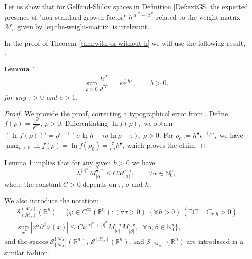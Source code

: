 \documentclass{article}
\theoremstyle{thmstyleone}
\newtheorem{Lemma}[Theorem]{Lemma}%
\theoremstyle{thmstyletwo}%
\theoremstyle{thmstylethree}%
\begin{document}
Let us show that for Gelfand-Shilov spaces in Definition
\ref{Def:extGS} the expected presence of "non-standard growth factor"
$h^{|\alpha|^\sigma + |\beta|^\sigma}$  
related to
the weight matrix  $\mathcal{M}_\sigma$ given by
\eqref{eq:the-weight-matrix} is irrelevant.

In the proof of Theorem \ref{thm:with-or-without-h} 
we will use the following result, \cite[Lemma 2.3]{PTT-01}. 

\begin{Lemma} \label{lm1}
\begin{equation} \label{eq:lema-from-ptt}
 \sup_{\rho >0}  \frac{h^{\rho^\sigma}}{\rho^{\tau \rho ^\sigma}} 
 = e^{\frac{\tau}{\sigma e} h^{\frac{\sigma}{\tau}}}, \qquad h>0,
  \end{equation}
for any $\tau > 0$ and $\sigma >1$.
  \end{Lemma}

\begin{proof} We provide the proof, correcting a typographical error from \cite{PTT-01}.
Define $f(\rho)=\frac{h^{\rho^{\sigma}}}{\rho^{\tau \rho^{\sigma}}}$, $\rho>0$. Differentiating $\ln f(\rho),$ we obtain
$(\ln f(\rho))'= \rho^{\sigma-1}(\sigma\ln h-\tau\sigma \ln \rho -\tau)$, $\rho>0.$
For $\rho_0:=h^{\frac{1}{\tau}}e^{-1/\sigma},$ we have
$\max_{\rho>0}\ln f(\rho)= \ln f(\rho_0)= \frac{\tau}{e\sigma} h^{\frac{\sigma}{\tau}}$,
which proves the claim.
\end{proof}
  
  Lemma \ref{lm1} implies
that for any given $h > 0$ we have
\begin{equation}\label{jede h}
    h ^{|\alpha|^\sigma}  M^{\frac{\tau}{2}, \sigma} _{|\alpha|} \leq
 C   M^{\tau, \sigma} _{|\alpha|}, \qquad \forall \alpha \in \mathbb{N}_0 ^n,
 \end{equation}
where the constant $C>0$ depends on $\tau$, $\sigma$ and $h$.


We also introduce the notation:
\begin{multline} \label{eq:GS-with-factor}
   \mathscr S_{(\mathcal{M}_\sigma ) }^{ (\mathcal{M}_\sigma )} (\mathbb R^n)  =
    \Big\{ \varphi \in C^{\infty} (\mathbb R^n) \colon
    (\forall \tau>0) \;(\forall h>0)\;(\exists C = C_{\tau, h}>0) \\
   \sup_{x} |x^\alpha \partial^\beta \varphi(x)|\leq 
   C h^{|\alpha|^\sigma + |\beta|^\sigma } M^{\tau, \sigma}_{|\alpha|} 
   M^{\tau, \sigma}_{|\beta|},
   \;\; \forall \alpha,\beta\in\mathbb N_0^n
   \Big\},
\end{multline}
and the spaces 
$ \mathscr S_{ \{\mathcal{M}_\sigma \}} ^{ \{\mathcal{M}_\sigma \}} (\mathbb R^n) $,
$ \mathscr S^{ [\mathcal{M}_\sigma ]} (\mathbb R^n) $,
and $ \mathscr S_{ [\mathcal{M}_\sigma ]} (\mathbb R^n) $
are introduced in a similar fashion.
\end{document}

